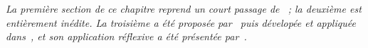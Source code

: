 \stars

\textit{La première section de ce chapitre reprend un court passage de~\cite{raimbault2017knowledge} ; la deuxième est entièrement inédite. La troisième a été proposée par~\cite{raimbault:halshs-01505084} puis dévelopée et appliquée dans~\cite{raimbault2017knowledge}, et son application réflexive a été présentée par~\cite{raimbault2017co}.}






